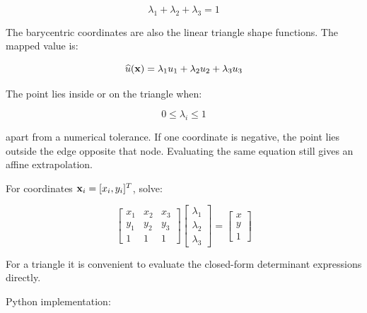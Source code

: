 \begin{equation}
    \lambda_1+\lambda_2+\lambda_3=1
\end{equation}

The barycentric coordinates are also the linear triangle shape functions. The
mapped value is:

\begin{equation}
    \widehat{u}(\mathbf{x}) = \lambda_1u_1+\lambda_2u_2+\lambda_3u_3
\end{equation}

The point lies inside or on the triangle when:

\begin{equation}
    0\leq\lambda_i\leq1
\end{equation}

apart from a numerical tolerance. If one coordinate is negative, the point lies
outside the edge opposite that node. Evaluating the same equation still gives
an affine extrapolation.

For coordinates $ \mathbf{x}_i=[x_i,y_i]^T $, solve:

\begin{equation}
    \begin{bmatrix}
        x_1 & x_2 & x_3 \\
        y_1 & y_2 & y_3 \\
        1   & 1   & 1
    \end{bmatrix}
    \begin{bmatrix}
        \lambda_1 \\
        \lambda_2 \\
        \lambda_3
    \end{bmatrix}
    =
    \begin{bmatrix}
        x \\
        y \\
        1
    \end{bmatrix}
\end{equation}

For a triangle it is convenient to evaluate the closed-form determinant
expressions directly.

Python implementation:

